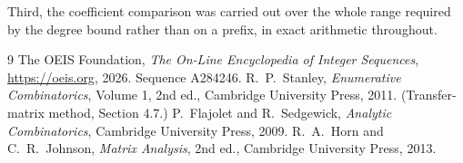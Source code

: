 \documentclass[11pt,a4paper]{article}
\theoremstyle{plain}
\theoremstyle{definition}
\begin{document}
Third, the coefficient comparison was carried out over the whole range required by the degree
bound rather than on a prefix, in exact arithmetic throughout.

\begin{thebibliography}{9}
 The OEIS Foundation, \emph{The On-Line Encyclopedia of Integer
Sequences}, \url{https://oeis.org}, 2026. Sequence A284246.
 R.~P.~Stanley, \emph{Enumerative Combinatorics}, Volume 1, 2nd ed.,
Cambridge University Press, 2011. (Transfer-matrix method, Section 4.7.)
 P.~Flajolet and R.~Sedgewick, \emph{Analytic Combinatorics}, Cambridge
University Press, 2009.
 R.~A.~Horn and C.~R.~Johnson, \emph{Matrix Analysis}, 2nd ed., Cambridge
University Press, 2013.
\end{thebibliography}
\end{document}
